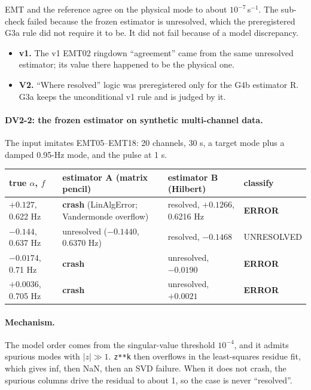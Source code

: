 \documentclass[10pt,a4paper]{article}
\newcommand{\sinv}{\,s$^{-1}$}
\begin{document}
\medskip
\noindent EMT and the reference agree on the physical mode to about
$10^{-7}$\sinv. The sub-check failed because the frozen estimator is
unresolved, which the preregistered G3a rule did not require it to be. It did not
fail because of a model discrepancy.
\begin{itemize}
\item \textbf{v1.} The v1 EMT02 ringdown ``agreement'' came from the same
  unresolved estimator; its value there happened to be the physical one.
\item \textbf{V2.} ``Where resolved'' logic was preregistered only for the G4b
  estimator R. G3a keeps the unconditional v1 rule and is judged by it.
\end{itemize}

\paragraph{DV2-2: the frozen estimator on synthetic multi-channel data.} The
input imitates EMT05--EMT18: 20 channels, 30 s, a target mode plus a damped
0.95-Hz mode, and the pulse at 1 s.

\medskip
\noindent\begin{tabularx}{\linewidth}{@{}L{2.8cm}YL{3.6cm}L{2.5cm}@{}}
\toprule
true $\alpha$, $f$ & estimator A (matrix pencil) & estimator B (Hilbert) & classify\\
\midrule
$+0.127$, 0.622 Hz & \textbf{crash} (LinAlgError; Vandermonde overflow) & resolved, $+0.1266$, 0.6216 Hz & \textbf{ERROR}\\
$-0.144$, 0.637 Hz & unresolved ($-0.1440$, 0.6370 Hz) & resolved, $-0.1468$ & UNRESOLVED\\
$-0.0174$, 0.71 Hz & \textbf{crash} & unresolved, $-0.0190$ & \textbf{ERROR}\\
$+0.0036$, 0.705 Hz & \textbf{crash} & unresolved, $+0.0021$ & \textbf{ERROR}\\
\bottomrule
\end{tabularx}

\medskip
\paragraph{Mechanism.} The model order comes from the singular-value threshold
$10^{-4}$, and it admits spurious modes with $|z|\gg1$. \texttt{z**k} then
overflows in the least-squares residue fit, which gives inf, then NaN, then an
SVD failure. When it does not crash, the spurious columns drive the residual to
about 1, so the case is never ``resolved''.
\end{document}

